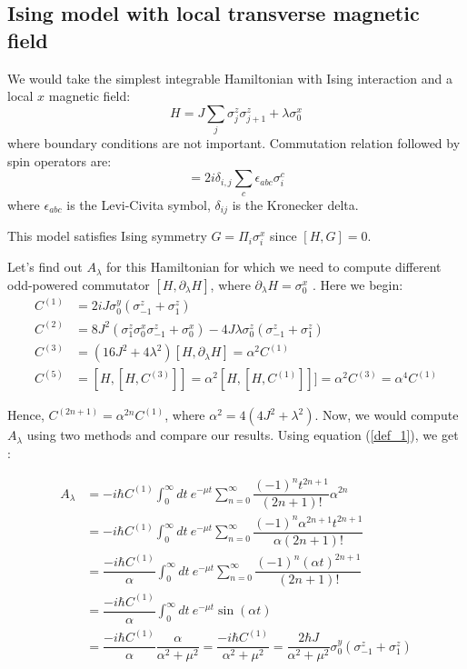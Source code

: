 \documentclass[11pt,a4paper]{article}
\begin{document}
\subsection{Ising model with local transverse magnetic field}
We would take the simplest integrable Hamiltonian with Ising interaction and a local $x$ magnetic field:
\begin{equation}
H= J \sum_{j}  \sigma_j^z \sigma_{j+1}^z +  \lambda  \sigma_0^x
\label{zz}
\end{equation}
where boundary conditions are not important. Commutation relation followed by spin operators are:
\begin{equation}
[\sigma_i^a, \sigma_{j}^b]= 2 i   \delta_{i,j} \sum_c  \epsilon_{a b c} \sigma_i^c
\end{equation}
where $\epsilon_{abc}$ is the Levi-Civita symbol, $ \delta_{ij}$ is the Kronecker delta.

This model satisfies Ising symmetry $G= \Pi_i \sigma_i^x$ since $[H, G]=0$.


Let's find out $A_{\lambda}$ for this Hamiltonian for which we need to compute different odd-powered commutator $[H, \partial_{\lambda} H]$, where $\partial_{\lambda} H=\sigma_0^x$ . Here we begin:
\begin{align}
C^{(1)}&= 2 i J \sigma_0^y ( \sigma_{-1}^z + \sigma_1^z) \\ 
C^{(2)}&= 8 J^2(\sigma^z_1 \sigma^x_0 \sigma^z_{-1} + \sigma^x_0) - 4J \lambda \sigma_0^z( \sigma_{-1}^z + \sigma_1^z) \\
C^{(3)} &=  (16 J^2 + 4 \lambda ^2) [H, \partial_{\lambda} H] = \alpha^2  C^{(1)} \\
C^{(5)}&=[H,[H, C^{(3)}]]  = \alpha^2 [H, [H,C^{(1)}]]]=\alpha^2 C^{(3)}=  \alpha^4 C^{(1)}   
\end{align}


Hence, $C^{(2n+1)}= \alpha^{2n} C^{(1)}$, where $\alpha^2= 4 (4 J^2 +  \lambda ^2) $. Now, we would compute $A_{\lambda}$ using two methods and compare our results. Using equation (\ref{def_1}), we get :

\begin{align*}
A_{\lambda} &= -i \hbar    C^{(1)} \int_0^{\infty} dt\ e^{-\mu t} \sum_{n=0}^{\infty} \dfrac{(-1)^{n} t ^{2n+1}}{(2n+1)!}  \alpha^{2n}  \\
 &= -i \hbar    C^{(1)} \int_0^{\infty} dt\ e^{-\mu t} \sum_{n=0}^{\infty} \dfrac{(-1)^{n}  \alpha^{2n+1} t ^{2n+1}}{\alpha(2n+1)!}   \\
  &= \dfrac{-i \hbar    C^{(1)}}{\alpha} \int_0^{\infty} dt\ e^{-\mu t} \sum_{n=0}^{\infty} \dfrac{(-1)^{n}  (\alpha t)^{2n+1}}{(2n+1)!}   \\
    &= \dfrac{-i \hbar    C^{(1)}}{\alpha} \int_0^{\infty} dt\ e^{-\mu t}  \sin  (\alpha t)   \\
     &= \dfrac{-i \hbar    C^{(1)}}{\alpha} \dfrac{\alpha}{\alpha^2 + \mu^2} =\dfrac{-i \hbar    C^{(1)}}{{\alpha^2 + \mu^2}} =  \dfrac{2 \hbar J}{{\alpha^2 + \mu^2}} \sigma_0^y ( \sigma_{-1}^z + \sigma_1^z) 
\end{align*}
 
\end{document}
